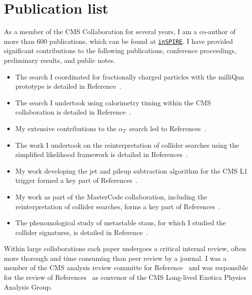 \documentclass[11pt,a4paper]{article}
\theoremstyle{plain} \numberwithin{equation}{section}
\theoremstyle{definition}
\newcounter{list}
\begin{document}
\section*{Publication list}
As a member of the CMS Collaboration for several years, I am a co-author of more than 600 publications, which can be found at 
\href{http://inspirehep.net/author/profile/M.Citron.2}{\texttt{inSPIRE}}. I have provided significant
  contributions to the following publications, conference proceedings,
  preliminary results, and public notes.
  \begin{itemize}
  \item The search I coordinated for fractionally charged particles with the milliQan prototype is detailed in Reference~\cite{ball2020search}.
  \item The search I undertook using calorimetry timing within the CMS collaboration is detailed in Reference~\cite{2019134876}.
  \item My extensive contributions to the $\alpha_T$~search led to References~\cite{CMS:2016dbr,CMS:2015dbr}.
  \item The work I undertook on the reinterpretation of collider searches using the simplified likelihood framework is detailed in References~\cite{simplifiedLikelihood,Buckley_2019}.
  \item My work developing the jet and pileup subtraction algorithm for the CMS L1 trigger formed a key part of References~\cite{Zabi:2016ljo,Kreis:2015jjr}.
  \item My work as part of the MasterCode collaboration, including the reinterpretation of collider searches, forms a key part of References~\cite{Bagnaschi:2016afc,Bagnaschi:2015eha,Buchmueller:2014yva,Buchmueller:2012hv,deVries:2015hva,Buchmueller:2015uqa}.
  \item The phenomological study of metastable staus, for which I studied the collider signatures, is detailed in Reference~\cite{Citron:2012fg}.
  \end{itemize}

Within large collaborations each paper undergoes a critical internal review, 
often more thorough and time consuming than peer review by a journal. 
I was a member of the CMS analysis review committe for Reference~\cite{PhysRevD.100.112003} 
and was responsible for the review of References~\cite{Sirunyan_2020,mlst_2020} as convenor 
of the CMS Long-lived Exotica Physics Analysis Group.




\end{document}
